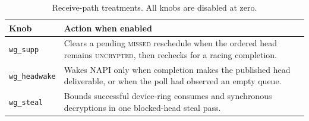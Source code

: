 \begin{table}[t]
  \caption{Receive-path treatments. All knobs are disabled at zero.}
  \label{tab:design-knobs}
  \small
  \begin{tabularx}{\columnwidth}{@{}lX@{}}
    \toprule
    Knob & Action when enabled \\
    \midrule
    \texttt{wg\_supp} &
      Clears a pending \textsc{missed} reschedule when the ordered head remains
      \textsc{uncrypted}, then rechecks for a racing completion. \\
    \texttt{wg\_headwake} &
      Wakes NAPI only when completion makes the published head deliverable, or
      when the poll had observed an empty queue. \\
    \texttt{wg\_steal} &
      Bounds successful device-ring consumes and synchronous decryptions in
      one blocked-head steal pass. \\
    \bottomrule
  \end{tabularx}
\end{table}

